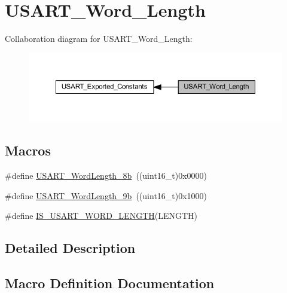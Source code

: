 \hypertarget{group___u_s_a_r_t___word___length}{}\section{U\+S\+A\+R\+T\+\_\+\+Word\+\_\+\+Length}
\label{group___u_s_a_r_t___word___length}
Collaboration diagram for U\+S\+A\+R\+T\+\_\+\+Word\+\_\+\+Length\+:
\nopagebreak
\begin{figure}[H]
\begin{center}
\leavevmode
\includegraphics[width=350pt]{group___u_s_a_r_t___word___length}
\end{center}
\end{figure}
\subsection*{Macros}
\begin{DoxyCompactItemize}
\item 
\#define \hyperlink{group___u_s_a_r_t___word___length_ga08682faddc657df85a93627b5a146c25}{U\+S\+A\+R\+T\+\_\+\+Word\+Length\+\_\+8b}~((uint16\+\_\+t)0x0000)
\item 
\#define \hyperlink{group___u_s_a_r_t___word___length_gae7dd162142660e09e2321aa3f33dc4d2}{U\+S\+A\+R\+T\+\_\+\+Word\+Length\+\_\+9b}~((uint16\+\_\+t)0x1000)
\item 
\#define \hyperlink{group___u_s_a_r_t___word___length_ga5b07b29ee91f0bea4c10ec0fd74fbc04}{I\+S\+\_\+\+U\+S\+A\+R\+T\+\_\+\+W\+O\+R\+D\+\_\+\+L\+E\+N\+G\+TH}(L\+E\+N\+G\+TH)
\end{DoxyCompactItemize}


\subsection{Detailed Description}


\subsection{Macro Definition Documentation}
\mbox{\label{group___u_s_a_r_t___word___length_ga5b07b29ee91f0bea4c10ec0fd74fbc04}} 
